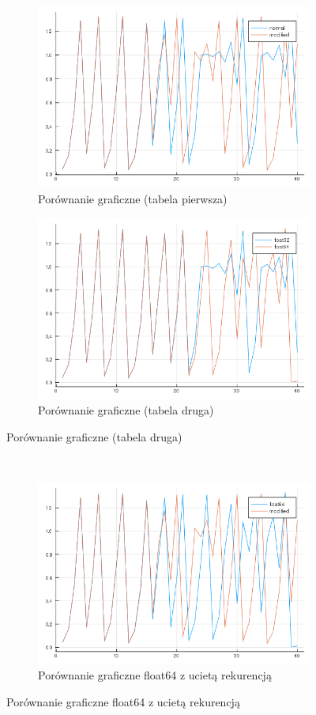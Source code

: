 \documentclass{article}
\begin{document}
\begin{figure}[ht]
	\begin{subfigure}{.5\textwidth}
		\centering
		\includegraphics[width=.8\linewidth]{JuliaPlots/comparition1}  
		\caption*{Porównanie graficzne (tabela pierwsza)}
		
	\end{subfigure}
	\begin{subfigure}{.5\textwidth}
		\centering
		\includegraphics[width=.8\linewidth]{JuliaPlots/comparition2}  
		\caption*{Porównanie graficzne (tabela druga)}
		
	\end{subfigure}
\end{figure}\\
\begin{figure}[ht]
\centering
	\begin{subfigure}{.5\textwidth}
		\centering
		\includegraphics[width=.8\linewidth]{JuliaPlots/comparition3}  
		\caption*{Porównanie graficzne float64 z ucietą rekurencją}
		
	\end{subfigure}
\end{figure}\\
\end{document}
